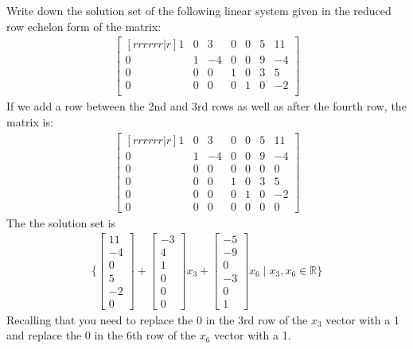 \begin{example}
Write down the solution set of the following linear system given in the reduced row echelon form of the matrix:
%
\begin{align*}
\begin{bmatrix}[rrrrrr|r]
1 & 0 & 3 & 0 & 0 & 5  & 11 \\
0 & 1 & -4 & 0 & 0 & 9 & -4 \\
0 & 0 & 0 & 1 & 0 & 3  & 5 \\
0 & 0 & 0 & 0 & 1 & 0 & -2 \\
\end{bmatrix}
\end{align*}
If we add a row between the 2nd and 3rd rows as well as after the fourth row, the matrix is:
%
\begin{align*}
\begin{bmatrix}[rrrrrr|r]
1 & 0 & 3 & 0 & 0 & 5  & 11 \\
0 & 1 & -4 & 0 & 0 & 9 & -4 \\
0 & 0 & 0 & 0 & 0 & 0 & 0 \\
0 & 0 & 0 & 1 & 0 & 3  & 5 \\
0 & 0 & 0 & 0 & 1 & 0 & -2 \\
0 & 0 & 0 & 0 & 0 & 0 & 0 
\end{bmatrix}
\end{align*}
The the solution set is 
%
\begin{align*}
\{ \begin{bmatrix}
11 \\ -4 \\ 0 \\ 5 \\ -2 \\ 0 
\end{bmatrix} + \begin{bmatrix}
-3 \\ 4 \\ 1 \\ 0 \\ 0 \\ 0 
\end{bmatrix} x_3 + 
\begin{bmatrix}
-5 \\ -9 \\ 0 \\ -3 \\ 0 \\ 1
\end{bmatrix} x_6 \; | \; x_3, x_6 \in \mathbb{R} \} 
\end{align*}
Recalling that you need to replace the 0 in the 3rd row of the $x_3$ vector with a 1  and replace the 0 in the 6th row of the $x_6$ vector with a 1.  
\end{example}

